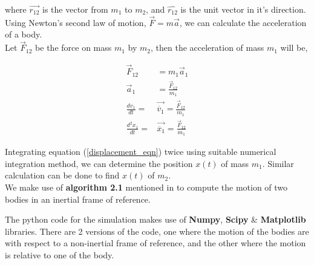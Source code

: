 where $\vec{r_{12}}$ is the vector from $m_1$ to $m_2$, and $\hat{r_{12}}$ is the unit vector in it's direction.\\

Using Newton's second law of motion, $\vec F=m \vec a$, we can calculate the acceleration of a body.\\

Let $\vec F_{12}$ be the force on mass $m_1$ by $m_2$, then the acceleration of mass $m_1$ will be,

\begin{equation}
    \begin{split}
        \vec F_{12} &= m_{1}\vec a_1\\
        \vec a_1 &= \frac{\vec F_{12}}{m_1}\\
        \frac{dv_1}{dt} ={} &{} \vec{\dot{v_1}} = \frac{\vec F_{12}}{m_1}\\
        \frac{d^2x_1}{dt} ={} &{} \vec{\ddot {x_1}} = \frac{\vec F_{12}}{m_1} \label{displacement_eqn}
    \end{split}
\end{equation}

Integrating equation (\ref{displacement_eqn}) twice using suitable numerical integration method, we can determine the position $x(t)$ of mass $m_1$. Similar calculation can be done to find $x(t)$ of $m_2$.\\

We make use of \textbf{algorithm 2.1} mentioned in \textcite{orbital_mechanics_4ed} to compute the motion of two bodies in an inertial frame of reference.

The python code for the simulation makes use of \textbf{Numpy}, \textbf{Scipy} \& \textbf{Matplotlib} libraries. There are 2 versions of the code, one where the motion of the bodies are with respect to a non-inertial frame of reference, and the other where the motion is relative to one of the body.
